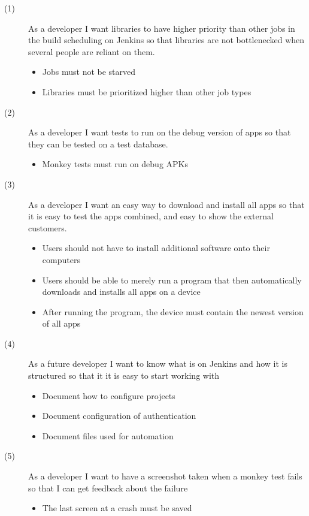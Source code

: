 \begin{description}
  \item[(1)] As a developer I want libraries to have higher priority than other jobs in the build scheduling on Jenkins so that libraries are not bottlenecked when several people are reliant on them.
  \begin{itemize}
    \item Jobs must not be starved
    \item Libraries must be prioritized higher than other job types
  \end{itemize}
  \item[(2)] As a developer I want tests to run on the debug version of apps so that they can be tested on a test database.
  \begin{itemize}
    \item Monkey tests must run on debug APKs
  \end{itemize}
  \item[(3)] As a developer I want an easy way to download and install all apps so that it is easy to test the apps combined, and easy to show the external customers.
  \begin{itemize}
    \item Users should not have to install additional software onto their computers
    \item Users should be able to merely run a program that then automatically downloads and installs all apps on a device
    \item After running the program, the device must contain the newest version of all apps
  \end{itemize}
  \item[(4)] As a future developer I want to know what is on Jenkins and how it is structured so that it it is easy to start working with
  \begin{itemize}
    \item Document how to configure projects
    \item Document configuration of authentication
    \item Document files used for automation
  \end{itemize}
  \item[(5)] As a developer I want to have a screenshot taken when a monkey test fails so that I can get feedback about the failure
  \begin{itemize}
    \item The last screen at a crash must be saved
  \end{itemize}
\end{description}

